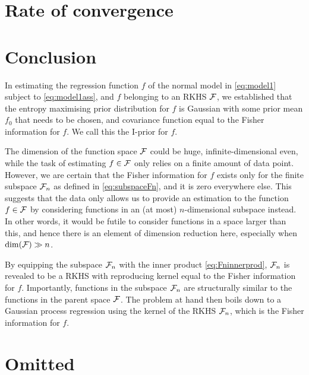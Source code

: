 \documentclass[a4paper,showframe,11pt,draft]{report}
\begin{document}
\section{Rate of convergence}

\section{Conclusion}

In estimating the regression function $f$ of the normal model in \eqref{eq:model1} subject to \eqref{eq:model1ass}, and $f$ belonging to an RKHS ${\mathcal F}$, we established that the entropy maximising prior distribution for $f$ is Gaussian with some prior mean $f_0$ that needs to be chosen, and covariance function equal to the Fisher information for $f$.
We call this the I-prior for $f$.

The dimension of the function space ${\mathcal F}$ could be huge, infinite-dimensional even, while the task of estimating $f\in{\mathcal F}$ only relies on a finite amount of data point.
However, we are certain that the Fisher information for $f$ exists only for the finite subspace ${\mathcal F}_n$ as defined in \eqref{eq:subspaceFn}, and it is zero everywhere else.
This suggests that the data only allows us to provide an estimation to the function $f\in{\mathcal F}$ by considering functions in an (at most) $n$-dimensional subspace instead.
In other words, it would be futile to consider functions in a space larger than this, and hence there is an element of dimension reduction here, especially when $\dim({\mathcal F}) \gg n$.

By equipping the subspace ${\mathcal F}_n$ with the inner product  \eqref{eq:Fninnerprod}, ${\mathcal F}_n$ is revealed to be a RKHS with reproducing kernel equal to the Fisher information for $f$.
Importantly, functions in the subspace ${\mathcal F}_n$ are structurally similar to the functions in the parent space ${\mathcal F}$.
The problem at hand then boils down to a Gaussian process regression using the kernel of the RKHS ${\mathcal F}_n$, which is the Fisher information for $f$.

\section{Omitted}


\hClosingStuffStandalone
\end{document}
